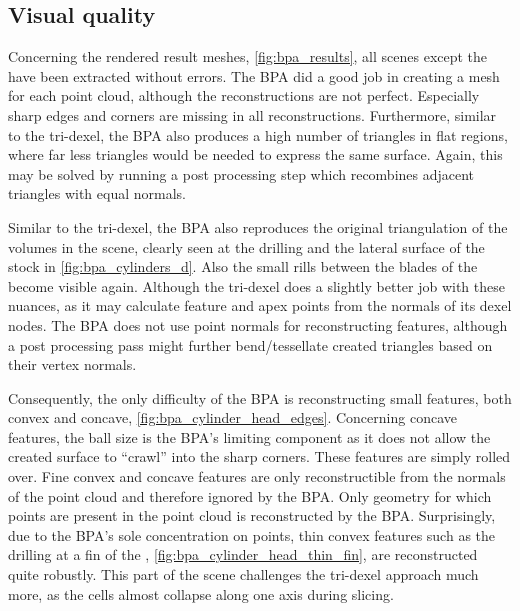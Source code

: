 \subsection{Visual quality}

Concerning the rendered result meshes, \cf \cref{fig:bpa_results}, all scenes except the \turbine have been extracted without errors.
The BPA did a good job in creating a mesh for each point cloud, although the reconstructions are not perfect.
Especially sharp edges and corners are missing in all reconstructions.
Furthermore, similar to the tri-dexel, the BPA also produces a high number of triangles in flat regions, where far less triangles would be needed to express the same surface.
Again, this may be solved by running a post processing step which recombines adjacent triangles with equal normals.

Similar to the tri-dexel, the BPA also reproduces the original triangulation of the volumes in the \cylindersd scene, clearly seen at the drilling and the lateral surface of the stock in \cref{fig:bpa_cylinders_d}.
Also the small rills between the blades of the \impeller become visible again.
Although the tri-dexel does a slightly better job with these nuances, as it may calculate feature and apex points from the normals of its dexel nodes.
The BPA does not use point normals for reconstructing features, although a post processing pass might \eg further bend/tessellate created triangles based on their vertex normals.

Consequently, the only difficulty of the BPA is reconstructing small features, both convex and concave, \cf \cref{fig:bpa_cylinder_head_edges}.
Concerning concave features, the ball size is the BPA's limiting component as it does not allow the created surface to \enquote{crawl} into the sharp corners.
These features are simply rolled over.
Fine convex and concave features are only reconstructible from the normals of the point cloud and therefore ignored by the BPA.
Only geometry for which points are present in the point cloud is reconstructed by the BPA.
Surprisingly, due to the BPA's sole concentration on points, thin convex features such as the drilling at a fin of the \cylinderhead, \cf \cref{fig:bpa_cylinder_head_thin_fin}, are reconstructed quite robustly.
This part of the scene challenges the tri-dexel approach much more, as the cells almost collapse along one axis during slicing.


